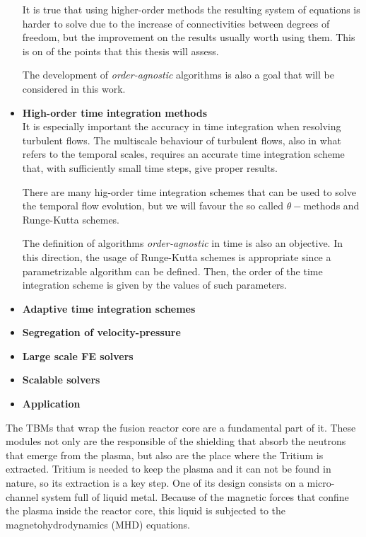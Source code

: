 \begin{itemize}
It is true that using higher-order methods the resulting system of equations is harder to solve due to the increase of connectivities between degrees of freedom, but the improvement on the results usually worth using them. This is on of the points that this thesis will assess.

The development of \textit{order-agnostic} algorithms is also a goal that will be considered in this work.

\item {\bf High-order time integration methods}\\
It is especially important the accuracy in time integration when resolving turbulent flows. The multiscale behaviour of turbulent flows, also in what refers to the temporal scales, requires an accurate time integration scheme that, with sufficiently small time steps, give proper results.

There are many hig-order time integration schemes that can be used to solve the temporal flow evolution, but we will favour the so called $ \theta- $methods and Runge-Kutta schemes.

The definition of algorithms \textit{order-agnostic} in time is also an objective. In this direction, the usage of Runge-Kutta schemes is appropriate since a parametrizable algorithm can be defined. Then, the order of the time integration scheme is given by the values of such parameters.

\item {\bf Adaptive time integration schemes}\\

\item {\bf Segregation of velocity-pressure}\\

\item {\bf Large scale FE solvers}\\

\item {\bf Scalable solvers}\\

\item {\bf Application}\\
\end{itemize}





The TBMs that wrap the fusion reactor core are a fundamental part of it. These modules not only are the responsible of the shielding that absorb the neutrons that emerge from the plasma, but also are the place where the Tritium is extracted. Tritium is needed to keep the plasma and it can not be found in nature, so its extraction is a key step. One of its design consists on a micro-channel system full of  liquid metal. Because of the magnetic forces that confine the plasma inside the reactor core, this liquid is subjected to the magnetohydrodynamics (MHD) equations.

